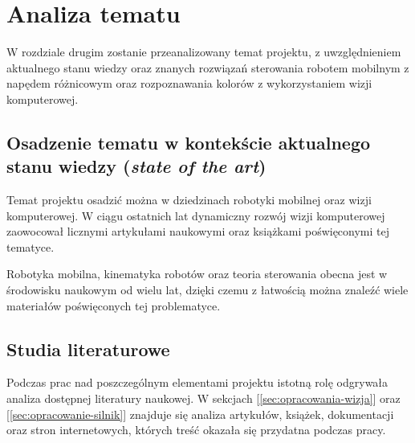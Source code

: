 \chapter{Analiza tematu}
\label{ch:analiza}

W rozdziale drugim zostanie przeanalizowany temat projektu, z uwzględnieniem aktualnego stanu wiedzy oraz znanych rozwiązań sterowania robotem mobilnym z napędem różnicowym oraz rozpoznawania kolorów z wykorzystaniem wizji komputerowej.



\section{Osadzenie tematu w kontekście aktualnego stanu wiedzy (\textit{state of the art})}
\label{sec:state_of_the_art}

Temat projektu osadzić można w dziedzinach robotyki mobilnej oraz wizji komputerowej. W ciągu ostatnich lat dynamiczny rozwój wizji komputerowej zaowocował licznymi artykułami naukowymi oraz książkami poświęconymi tej tematyce. 

Robotyka mobilna, kinematyka robotów oraz teoria sterowania obecna jest w środowisku naukowym od wielu lat, dzięki czemu z łatwością można znaleźć wiele materiałów poświęconych tej problematyce. 

\section{Studia literaturowe}
\label{sec:studia_literaturowe}

Podczas prac nad poszczególnym elementami projektu istotną rolę odgrywała analiza dostępnej literatury naukowej. W sekcjach [\ref{sec:opracowania-wizja}] oraz [\ref{sec:opracowanie-silnik}] znajduje się analiza artykułów, książek, dokumentacji oraz stron internetowych, których treść okazała się przydatna podczas pracy. 


